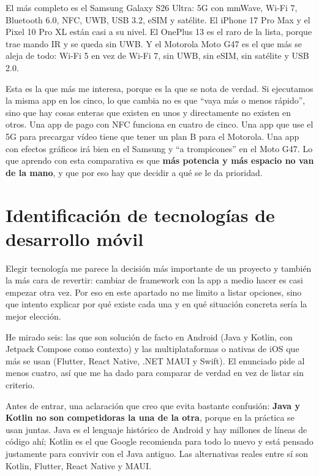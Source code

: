 
El más completo es el Samsung Galaxy S26 Ultra: 5G con mmWave, Wi-Fi 7, Bluetooth 6.0, NFC, UWB, USB 3.2, eSIM y satélite. El iPhone 17 Pro Max y el Pixel 10 Pro XL están casi a su nivel. El OnePlus 13 es el raro de la lista, porque trae mando IR y se queda sin UWB. Y el Motorola Moto G47 es el que más se aleja de todo: Wi-Fi 5 en vez de Wi-Fi 7, sin UWB, sin eSIM, sin satélite y USB 2.0.


Esta es la que más me interesa, porque es la que se nota de verdad. Si ejecutamos la misma app en los cinco, lo que cambia no es que \enquote{vaya más o menos rápido}, sino que hay cosas enteras que existen en unos y directamente no existen en otros. Una app de pago con NFC funciona en cuatro de cinco. Una app que use el 5G para precargar vídeo tiene que tener un plan B para el Motorola. Una app con efectos gráficos irá bien en el Samsung y \enquote{a trompicones} en el Moto G47. Lo que aprendo con esta comparativa es que \textbf{más potencia y más espacio no van de la mano}, y que por eso hay que decidir a qué se le da prioridad.\newpage
\section{Identificación de tecnologías de desarrollo móvil}

Elegir tecnología me parece la decisión más importante de un proyecto y también la más cara de revertir: cambiar de framework con la app a medio hacer es casi empezar otra vez. Por eso en este apartado no me limito a listar opciones, sino que intento explicar por qué existe cada una y en qué situación concreta sería la mejor elección.

He mirado seis: las que son solución de facto en Android (Java y Kotlin, con Jetpack Compose como contexto) y las multiplataformas o nativas de iOS que más se usan (Flutter, React Native, .NET MAUI y Swift). El enunciado pide al menos cuatro, así que me ha dado para comparar de verdad en vez de listar sin criterio.

Antes de entrar, una aclaración que creo que evita bastante confusión: \textbf{Java y Kotlin no son competidoras la una de la otra}, porque en la práctica se usan juntas. Java es el lenguaje histórico de Android y hay millones de líneas de código ahí; Kotlin es el que Google recomienda para todo lo nuevo y está pensado justamente para convivir con el Java antiguo. Las alternativas reales entre sí son Kotlin, Flutter, React Native y MAUI.

